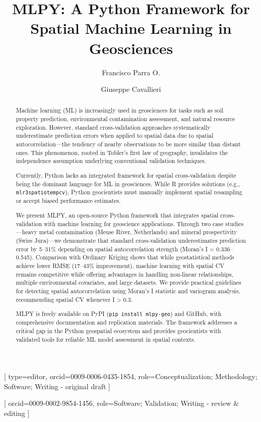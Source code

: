 \documentclass[a4paper,fleqn]{cas-sc}
\begin{document}
\let\WriteBookmarks\relax
\def\floatpagepagefraction{1}
\def\textpagefraction{.001}


\title[mode=title]{MLPY: A Python Framework for Spatial Machine Learning in Geosciences}

\author[1]{Francisco Parra O.}[
    type=editor,
    orcid=0009-0006-0435-1854,
    role=Conceptualization; Methodology; Software; Writing - original draft
]

\author[1]{Giuseppe Cavallieri}[
    orcid=0009-0002-9854-1456,
    role=Software; Validation; Writing - review \& editing
]

\address[1]{Department of Informatics, Universidad de Santiago de Chile, Santiago, Chile}

\begin{abstract}
Machine learning (ML) is increasingly used in geosciences for tasks such as soil property prediction, environmental contamination assessment, and natural resource exploration. However, standard cross-validation approaches systematically underestimate prediction errors when applied to spatial data due to spatial autocorrelation---the tendency of nearby observations to be more similar than distant ones. This phenomenon, rooted in Tobler's first law of geography, invalidates the independence assumption underlying conventional validation techniques.

Currently, Python lacks an integrated framework for spatial cross-validation despite being the dominant language for ML in geosciences. While R provides solutions (e.g., \texttt{mlr3spatiotempcv}), Python geocientists must manually implement spatial resampling or accept biased performance estimates.

We present MLPY, an open-source Python framework that integrates spatial cross-validation with machine learning for geoscience applications. Through two case studies---heavy metal contamination (Meuse River, Netherlands) and mineral prospectivity (Swiss Jura)---we demonstrate that standard cross-validation underestimates prediction error by 5--31\% depending on spatial autocorrelation strength (Moran's I = 0.336--0.545). Comparison with Ordinary Kriging shows that while geostatistical methods achieve lower RMSE (17--43\% improvement), machine learning with spatial CV remains competitive while offering advantages in handling non-linear relationships, multiple environmental covariates, and large datasets. We provide practical guidelines for detecting spatial autocorrelation using Moran's I statistic and variogram analysis, recommending spatial CV whenever I > 0.3.

MLPY is freely available on PyPI (\texttt{pip install mlpy-geo}) and GitHub, with comprehensive documentation and replication materials. The framework addresses a critical gap in the Python geospatial ecosystem and provides geocientists with validated tools for reliable ML model assessment in spatial contexts.
\end{abstract}
\end{document}
